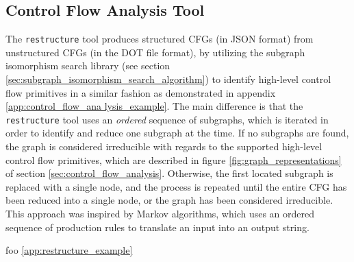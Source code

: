 
\subsection{Control Flow Analysis Tool}
\label{sec:impl_control_flow_analysis_tool}

The \texttt{restructure} tool produces structured CFGs (in JSON format) from unstructured CFGs (in the DOT file format), by utilizing the subgraph isomorphism search library (see section \ref{sec:subgraph_isomorphism_search_algorithm}) to identify high-level control flow primitives in a similar fashion as demonstrated in appendix \ref{app:control_flow_ana
lysis_example}. The main difference is that the \texttt{restructure} tool uses an \textit{ordered} sequence of subgraphs, which is iterated in order to identify and reduce one subgraph at the time. If no subgraphs are found, the graph is considered irreducible with regards to the supported high-level control flow primitives, which are described in figure \ref{fig:graph_representations} of section \ref{sec:control_flow_analysis}. Otherwise, the first located subgraph is replaced with a single node, and the process is repeated until the entire CFG has been reduced into a single node, or the graph has been considered irreducible. This approach was inspired by Markov algorithms, which uses an ordered sequence of production rules to translate an input into an output string.

foo \ref{app:restructure_example}
